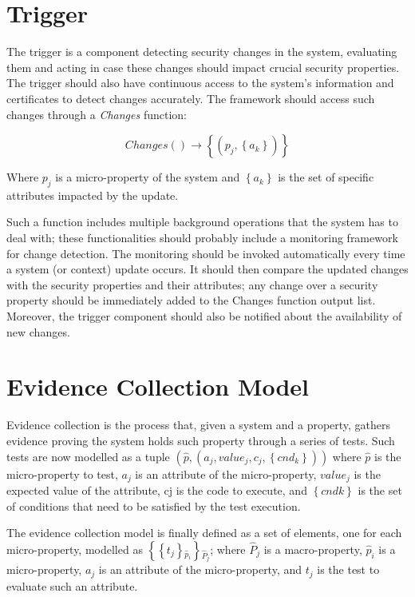 \section{Trigger}
The trigger is a component detecting security changes in the system, evaluating them and acting in case these changes should impact crucial security properties. The trigger should also have continuous access to the system's information and certificates to detect changes accurately. The framework should access such changes through a \textit{Changes} function: 

\[Changes() \rightarrow \left \{ \left ( p_j, \left \{ a_k \right \} \right ) \right \} \]

Where \(p_j\) is a micro-property of the system and \( \left \{a_k \right \} \) is the set of specific attributes impacted by the update.

Such a function includes multiple background operations that the system has to deal with; these functionalities should probably include a monitoring framework for change detection. The monitoring should be invoked automatically every time a system (or context) update occurs. It should then compare the updated changes with the security properties and their attributes; any change over a security property should be immediately added to the Changes function output list. Moreover, the trigger component should also be notified about the availability of new changes.


\section{Evidence Collection Model}

Evidence collection is the process that, given a system and a property, gathers evidence proving the system holds such property through a series of tests. Such tests are now modelled as a tuple \( \left ( \hat{p}, \left (a_j, value_j, c_j, \left \{ cnd_k \right \} \right ) \right ) \)  where \( \hat{p} \) is the micro-property to test, \(a_j\) is an attribute of the micro-property, 
\(value_j\) is the expected value of the attribute, cj is the code to execute, and \( \left \{ cndk \right \} \) is the set of conditions that need to be satisfied by the test execution.

The evidence collection model is finally defined as a set of elements, one for each micro-property, modelled as \(  \left \{ \left \{ t_j \right \} {_{\hat{p}_i}} \right \} {_{\hat{P}_j}} \); where \( \hat{P}_j \) is a macro-property,  \( \hat{p}_i \) is a micro-property, \(a_j\) is an attribute of the micro-property, and \(t_j\) is the test to evaluate such an attribute.


